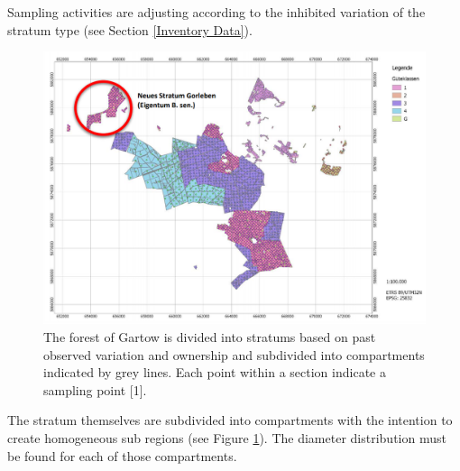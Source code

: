Sampling activities are adjusting according to the inhibited variation of the stratum type (see Section \ref{Inventory Data}).

\begin{figure}[H]
  \includegraphics[width=\textwidth]{Gartow_map.png}
  \caption{The forest of Gartow is divided into stratums based on past observed variation and ownership and subdivided into compartments indicated by grey lines. Each point within a section indicate a sampling point [1].}
  \label{fig:Gartow Map}
\end{figure}

The stratum themselves are subdivided into compartments with the intention to create homogeneous sub regions (see Figure \ref{fig:Gartow Map}). The diameter distribution must be found for each of those compartments.
